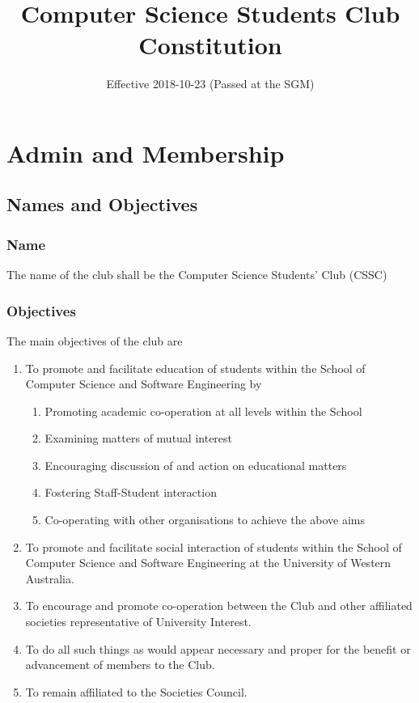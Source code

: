 \documentclass[10pt,a4paper]{report}
\date{Effective 2018-10-23 (Passed at the SGM)}
\title{Computer Science Students Club Constitution}
\begin{document}
	\maketitle
	\newpage
	\begin{small}
		\tableofcontents
	\end{small}
	\newpage

	\chapter{Admin and Membership}

	\section{Names and Objectives}
		\subsection{Name}
			The name of the club shall be the Computer Science Students' Club (CSSC)

		\subsection{Objectives}
		The main objectives of the club are
			\begin{enumerate}[label=\alph*]
				\item To promote and facilitate education of students within the School of Computer Science and Software Engineering by
				\begin{enumerate}[label=\roman*]
					\item Promoting academic co-operation at all levels within the School
					\item Examining matters of mutual interest
					\item Encouraging discussion of and action on educational matters
					\item Fostering Staff-Student interaction
					\item Co-operating with other organisations to achieve the above aims
				\end{enumerate}
				\item To promote and facilitate social interaction of students within the School of Computer Science and Software Engineering at the University of Western Australia.
				\item To encourage and promote co-operation between the Club and other affiliated societies representative of University Interest.
				\item To do all such things as would appear necessary and proper for the benefit or advancement of members to the Club.
				\item To remain affiliated to the Societies Council.
			\end{enumerate}
\end{document}
